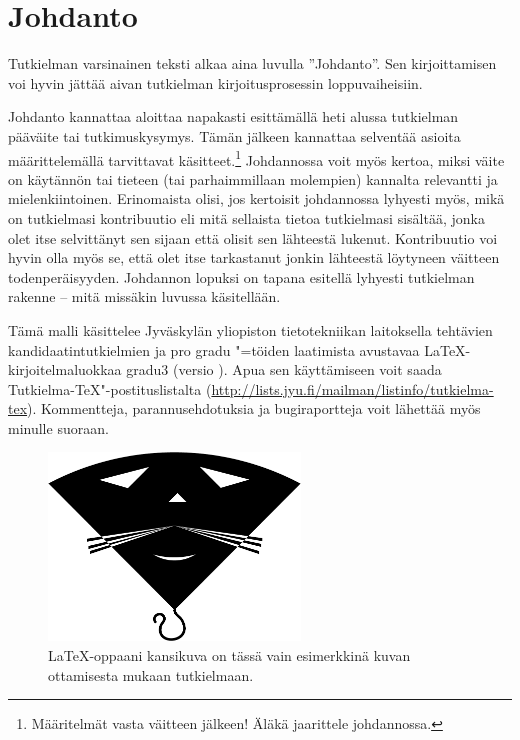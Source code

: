\documentclass[utf8,bachelor]{gradu3}
\begin{document}
\mainmatter

\chapter{Johdanto}

Tutkielman varsinainen teksti alkaa aina luvulla ''Johdanto''.  Sen
kirjoittamisen voi hyvin jättää aivan tutkielman kirjoitusprosessin
loppuvaiheisiin.

Johdanto kannattaa aloittaa napakasti esittämällä heti alussa
tutkielman pääväite tai tutkimuskysymys.  Tämän jälkeen kannattaa
selventää asioita määrittelemällä tarvittavat
käsitteet.\footnote{Määritelmät vasta väitteen jälkeen! Äläkä
  jaarittele johdannossa.}  Johdannossa voit myös kertoa, miksi väite
on käytännön tai tieteen (tai parhaimmillaan molempien) kannalta
relevantti ja mielenkiintoinen.  Erinomaista olisi, jos kertoisit
johdannossa lyhyesti myös, mikä on tutkielmasi kontribuutio eli mitä
sellaista tietoa tutkielmasi sisältää, jonka olet itse selvittänyt sen
sijaan että olisit sen lähteestä lukenut.  Kontribuutio voi hyvin olla
myös se, että olet itse tarkastanut jonkin lähteestä löytyneen
väitteen todenperäisyyden.  Johdannon lopuksi on tapana esitellä
lyhyesti tutkielman rakenne -- mitä missäkin luvussa käsitellään.

Tämä malli käsittelee Jyväskylän yliopiston tietotekniikan laitoksella
tehtävien kandidaatintutkielmien ja pro gradu "=töiden laatimista
avustavaa \LaTeX-kirjoitelmaluokkaa gradu3 (versio \graduclsversion).
Apua sen käyttämiseen voit saada Tutkielma-TeX"-postituslistalta
(\url{http://lists.jyu.fi/mailman/listinfo/tutkielma-tex}).
Kommentteja, parannusehdotuksia ja bugiraportteja voit lähettää myös
minulle suoraan.

\begin{figure}[h]\centering
  \includegraphics[height=5cm,keepaspectratio]{opus-kissa}
  \caption[\LaTeX-oppaani \parencite{kaijanaho03:_latex_ams_latex}
  kansikuva]{\LaTeX-oppaani \parencite{kaijanaho03:_latex_ams_latex}
    kansikuva on tässä vain esimerkkinä kuvan ottamisesta mukaan
    tutkielmaan.}
  \label{fig:opus-kissa}
\end{figure}
\end{document}
